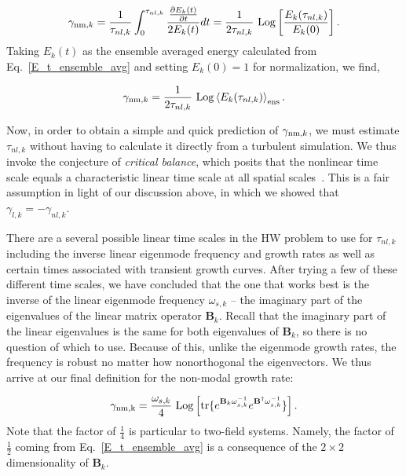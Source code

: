 \documentclass[twocolumn,showkeys,superscriptaddress]{revtex4}
\def\beq{\begin{equation}}
\def\eeq{\end{equation}}
\newcommand{\pdiff}[2]{\frac{\partial#1}{\partial#2}}
\begin{document}
\beq
\label{gamma_nm_calc}
\gamma_{{\rm{nm}},k} = \frac{1}{\tau_{nl,k}} \int_0^{\tau_{nl,k}} \frac{\pdiff{E_k(t)}{t}}{2 E_k(t)} dt = \frac{1}{2 \tau_{nl,k}} \ {\rm{Log}} \left[ \frac{E_k(\tau_{nl,k})}{E_k(0)}\right].
\eeq
Taking $E_k(t)$ as the ensemble averaged energy calculated from Eq.~\ref{E_t_ensemble_avg} and setting $E_k(0) = 1$ for normalization, we find,

\beq
\label{gamma_nm}
\gamma_{{\rm{nm}},k} = \frac{1}{2 \tau_{nl,k}} \ {\rm{Log}} \left<  E_k(\tau_{nl,k}) \right>_{\rm{ens}}.
\eeq

Now, in order to obtain a simple and quick prediction of $\gamma_{{\rm{nm}},k}$, we must estimate $\tau_{nl,k}$ without having to calculate it directly from a turbulent simulation. 
We thus invoke the conjecture of \emph{critical balance}, which posits that the nonlinear time scale equals a characteristic linear time scale at all spatial scales~\cite{schekochihin2012}. 
This is a fair assumption in light of our discussion above, in which we showed that $\gamma_{l,k} = - \gamma_{nl,k}$.

There are a several possible linear time scales in the HW problem to use for $\tau_{nl,k}$ 
including the inverse linear eigenmode frequency and growth rates as well as certain times associated with transient growth curves. 
After trying a few of these different time scales, we have concluded that the one that works best is the inverse of the linear eigenmode frequency $\omega_{s,k}$
-- the imaginary part of the eigenvalues of the linear matrix operator $\mathbf{B}_k$.
Recall that the imaginary part of the linear eigenvalues is the same for both eigenvalues of $\mathbf{B}_k$, so there is no question of which to use. Because of this, unlike the eigenmode growth rates,
the frequency is robust no matter how nonorthogonal the eigenvectors. We thus arrive at our final definition for the non-modal growth rate:

\beq
\label{gamma_omega_def}
\gamma_{\rm{nm},k} = \frac{\omega_{s,k}}{4} \ {\rm{Log}} \left[ {\rm{tr}} \{ e^{\mathbf{B}_k \omega_{s,k}^{-1}} e^{\mathbf{B}^{\dagger} \omega_{s,k}^{-1}} \} \right].
\eeq
Note that the factor of $\frac{1}{4}$ is particular to two-field systems. Namely, the factor of $\frac{1}{2}$ coming from Eq.~\ref{E_t_ensemble_avg} is a consequence of the $2 \times 2$ dimensionality
of $\mathbf{B}_k$.
\end{document}

